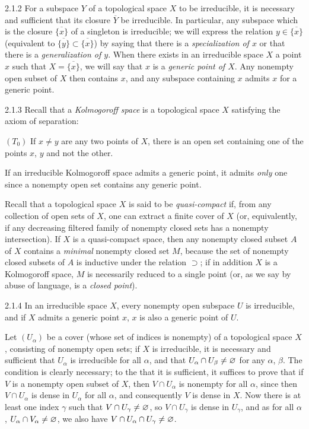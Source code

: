 \begin{env}{2.1.2}
\label{env-0.2.1.2}
For a subspace $Y$ of a topological space $X$ to be irreducible, it is necessary
and sufficient that its closure $\overline{Y}$ be irreducible. In particular,
any subspace which is the closure $\overline{\{x\}}$ of a singleton is
irreducible; we will express the relation $y\in\overline{\{x\}}$ (equivalent to
$\overline{\{y\}}\subset\overline{\{x\}}$) by saying that there is a
\emph{specialization of $x$} or that there is a \emph{generalization of $y$}.
When there exists in an irreducible space $X$ a point $x$ such that
$X=\overline{\{x\}}$, we will say that $x$ is a \emph{generic point of $X$}. Any
nonempty open subset of $X$ then contains $x$, and any subspace containing $x$
admits $x$ for a generic point.
\end{env}

\begin{env}{2.1.3}
\label{env-0.2.1.3}
Recall that a \emph{Kolmogoroff space} is a topological space $X$ satisfying the
axiom of separation:

$(T_0)$ If $x\neq y$ are any two points of $X$, there is an open set containing
one of the points $x$, $y$ and not the other.

If an irreducible Kolmogoroff space admits a generic point, it admits
\emph{only} one since a nonempty open set contains any generic point.

Recall that a topological space $X$ is said to be \emph{quasi-compact} if, from
any collection of open sets of $X$, one can extract a finite cover of $X$ (or,
equivalently, if any decreasing filtered family of nonempty closed sets has a
nonempty intersection). If $X$ is a quasi-compact space, then any nonempty
closed subset $A$ of $X$ contains a \emph{minimal} nonempty closed set $M$,
because the set of nonempty closed subsets of $A$ is inductive under the
relation $\supset$; if in addition $X$ is a Kolmogoroff space, $M$ is
necessarily reduced to a single point (or, as we say by abuse of language, is a
\emph{closed point}).
\end{env}

\begin{env}{2.1.4}
\label{env-0.2.1.4}
In an irreducible space $X$, every nonempty open subspace $U$ is irreducible,
and if $X$ admits a generic point $x$, $x$ is also a generic point of $U$.

Let $(U_\alpha)$ be a cover (whose set of indices is nonempty) of a topological
space $X$, consisting of nonempty open sets; if $X$ is irreducible, it is
necessary and sufficient that $U_\alpha$ is irreducible for all $\alpha$, and
that $U_\alpha\cap U_\beta\neq\varnothing$ for any $\alpha$, $\beta$. The condition is
clearly necessary; to the that it is sufficient, it suffices to prove that if
$V$ is a nonempty open subset of $X$, then $V\cap U_\alpha$ is nonempty for all
$\alpha$, since then $V\cap U_\alpha$ is dense in $U_\alpha$ for all $\alpha$,
and consequently $V$ is dense in $X$. Now there is at least one index $\gamma$
such that $V\cap U_\gamma\neq\varnothing$, so $V\cap U_\gamma$ is dense in $U_\gamma$,
and as for all $\alpha$, $U_\alpha\cap V_\alpha\neq\varnothing$, we also have
$V\cap U_\alpha\cap U_\gamma\neq\varnothing$.
\end{env}

